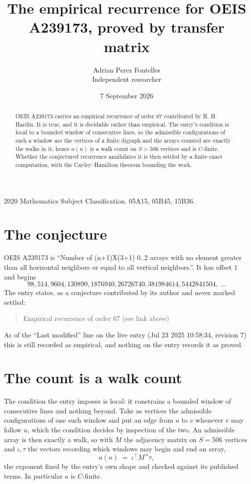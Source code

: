 \documentclass[11pt,a4paper]{article}
\title{The empirical recurrence for OEIS A239173, proved by transfer matrix}
\author{Adrian Perez Fontelles\\ \small Independent researcher}
\date{7 September 2026}
\theoremstyle{plain}
\theoremstyle{definition}
\begin{document}
\maketitle

\begin{abstract}
OEIS A239173 carries an empirical recurrence of order $67$ contributed by R. H. Hardin. It is
true, and it is decidable rather than empirical. The entry's condition is local to a bounded window of consecutive lines, so
the admissible configurations of such a window are the vertices of a finite digraph and the
arrays counted are exactly the walks in it; hence $a(n)$ is a walk count on $S=506$ vertices
and is $C$-finite. Whether the conjectured recurrence annihilates it is then settled by a
finite exact computation, with the Cayley--Hamilton theorem bounding the work.
\end{abstract}

\noindent\small 2020 Mathematics Subject Classification. 05A15, 05B45, 15B36.\normalsize

\section{The conjecture}

OEIS A239173 is ``Number of (n+1)X(3+1) 0..2 arrays with no element greater than all horizontal neighbors or equal to all vertical neighbors.''. It has offset $1$ and begins
\[
98, 514, 9604, 130890, 1876940, 26726740, 381984614, 5442841504,\ \dots
\]
The entry states, as a conjecture contributed by its author and never marked settled:
\begin{quote}
Empirical recurrence of order 67 (see link above)
\end{quote}
As of the ``Last modified'' line on the live entry (Jul 23 2025 10:58:34, revision 7) this is still
recorded as empirical, and nothing on the entry records it as proved.

\section{The count is a walk count}

The condition the entry imposes is local: it constrains a bounded window of consecutive lines and nothing beyond. Take as
vertices the admissible configurations of one such window and put an edge from $u$ to $v$
whenever $v$ may follow $u$, which the condition decides by inspection of the two. An
admissible array is then exactly a walk, so with $M$ the adjacency matrix on $S=506$ vertices
and $\iota,\tau$ the vectors recording which windows may begin and end an array,
\[
a(n)\;=\;\iota^{\!\top}M^{\,n}\tau ,
\]
the exponent fixed by the entry's own shape and checked against its published terms. In
particular $a$ is $C$-finite.
\end{document}

